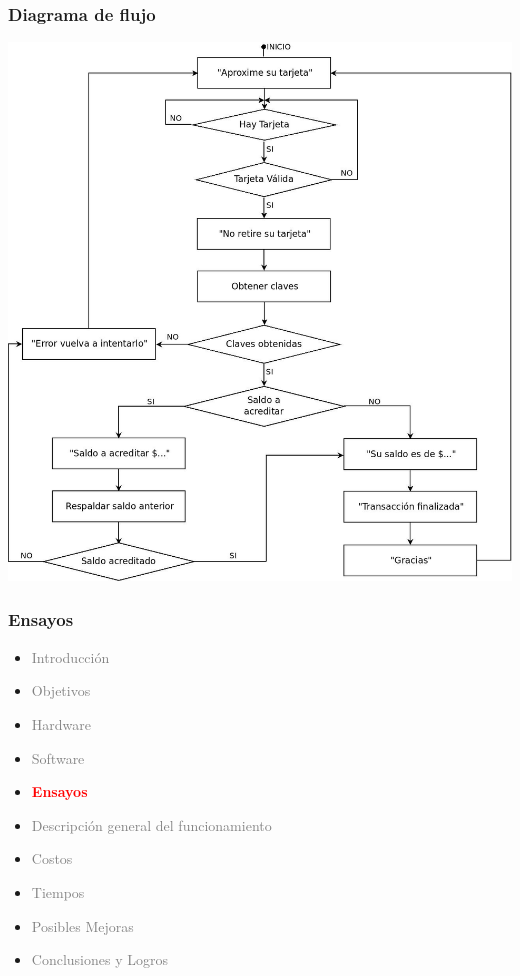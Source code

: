 \documentclass{beamer}
\begin{document}
\begin{frame}
	\frametitle{Diagrama de flujo}
	\begin{center}
		\includegraphics[scale=.166]{Imagenes/flujo.jpg}
	\end{center}
\end{frame}	

\begin{frame}
	\frametitle{Ensayos}
	\begin{itemize}
		\item \textcolor{gray}{Introducción}
		\item \textcolor{gray}{Objetivos}
		\item \textcolor{gray}{Hardware}
		\item \textcolor{gray}{Software}
		\item \textcolor{red}{\bf{Ensayos}}
		\item \textcolor{gray}{Descripción general del funcionamiento}		
		\item \textcolor{gray}{Costos}
		\item \textcolor{gray}{Tiempos}		
		\item \textcolor{gray}{Posibles Mejoras}
		\item \textcolor{gray}{Conclusiones y Logros}
	\end{itemize}
\end{frame}
\end{document}
